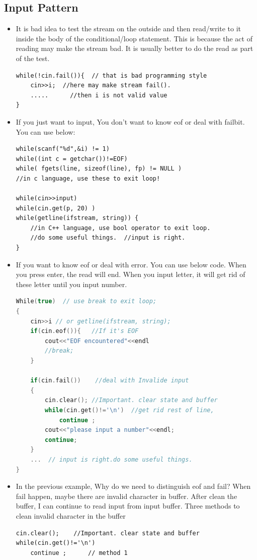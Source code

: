 \documentclass[a4paper,11pt,twoside]{book}
\begin{document}
\subsection{Input Pattern}

\begin{itemize}
	\item It is bad idea to test the stream on the outside and then read/write to it inside the body of the conditional/loop statement. This is because the act of reading may make the stream bad. It is usually better to do the read as part of the test.
	
\begin{lstlisting}[numbers=none]
while(!cin.fail()){  // that is bad programming style
	cin>>i;  //here may make stream fail().
	.....      //then i is not valid value
}
	\end{lstlisting}
	
	\item If you just want to input, You don't want to know eof or deal with failbit. You can use below: \\
	
\begin{lstlisting}[numbers=none]
while(scanf("%d",&i) != 1)
while((int c = getchar())!=EOF)
while( fgets(line, sizeof(line), fp) != NULL )
//in c language, use these to exit loop!
	
while(cin>>input)
while(cin.get(p, 20) )
while(getline(ifstream, string)) {
	//in C++ language, use bool operator to exit loop.
	//do some useful things.  //input is right.
}
\end{lstlisting}
	
	\item If you want to know eof or deal with error. You can use below code. When you press enter, the read will end. When you input letter, it will get rid of these letter until you input number. 
\begin{lstlisting}[frame=single, language=c++]
While(true)  // use break to exit loop;
{
	cin>>i // or getline(ifstream, string);
	if(cin.eof()){   //If it's EOF
		cout<<"EOF encountered"<<endl
		//break;
	}
	
	if(cin.fail())    //deal with Invalide input
	{
		cin.clear(); //Important. clear state and buffer
		while(cin.get()!='\n')  //get rid rest of line,
			continue ;
		cout<<"please input a number"<<endl;
		continue;
	}
	...  // input is right.do some useful things.
}
\end{lstlisting}
	
	\item In the previous example, Why do we need to distinguish eof and fail? When fail happen, maybe there are invalid character in buffer. After clean the buffer, I can continue to read input from input buffer. Three methods to clean invalid character in the buffer
\begin{lstlisting}[numbers=none]
cin.clear();    //Important. clear state and buffer
while(cin.get()!='\n')
	continue ;      // method 1
	

\end{lstlisting}
\end{itemize}
\end{document}
